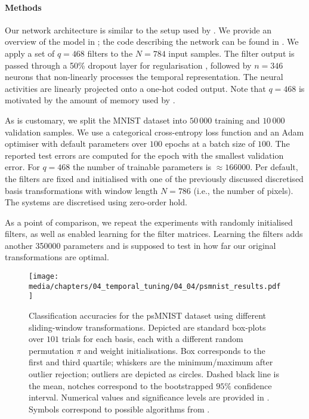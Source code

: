 \paragraph{Methods}
Our network architecture is similar to the setup used by \citet{voelker2019lmu}.
We provide an overview of the model in ; the code describing the network can be found in .
We apply a set of $q = 468$ \FIR filters to the $N = 784$ input samples.
The filter output is passed through a 50\% dropout layer for regularisation \citep{hinton2012improving}, followed by $n = 346$ \ReLU neurons that non-linearly processes the temporal representation.
The neural activities are linearly projected onto a one-hot coded output.
Note that $q = 468$ is motivated by the amount of memory used by \citet{chandar2019nonsaturating}.

As is customary, we split the MNIST dataset into $50\,000$ training and $10\,000$ validation samples.
We use a categorical cross-entropy loss function and an Adam optimiser \citep{kingma2015adam} with default parameters over $100$ epochs at a batch size of $100$.
The reported test errors are computed for the epoch with the smallest validation error.
For $q = 468$ the number of trainable parameters is $\approx\num{166000}$.
Per default, the \FIR filters are fixed and initialised with one of the previously discussed discretised basis transformations with window length $N = 786$ (i.e., the number of pixels).
The \LTI systems are discretised using zero-order hold.

As a point of comparison, we repeat the experiments with randomly initialised \FIR filters, as well as enabled learning for the \FIR filter matrices.
Learning the \FIR filters adds another \num{350000} parameters and is supposed to test in how far our original transformations are optimal.

\begin{figure}
\centering
\texttt{[image: media/chapters/04\_temporal\_tuning/04\_04/psmnist\_results.pdf]}
\caption[Classification accuracies for the psMNIST dataset using different sliding-window transformations]{Classification accuracies for the psMNIST dataset using different sliding-window transformations.
Depicted are standard box-plots over $101$ trials for each basis, each with a different random permutation $\pi$ and weight initialisations. Box corresponds to the first and third quartile; whiskers are the minimum/maximum after outlier rejection; outliers are depicted as circles.
Dashed black line is the mean, notches correspond to the bootstrapped $95\%$ confidence interval.
Numerical values and significance levels are provided in .
Symbols correspond to possible algorithms from .
}
\label{fig:psmnist_results}
\end{figure}

